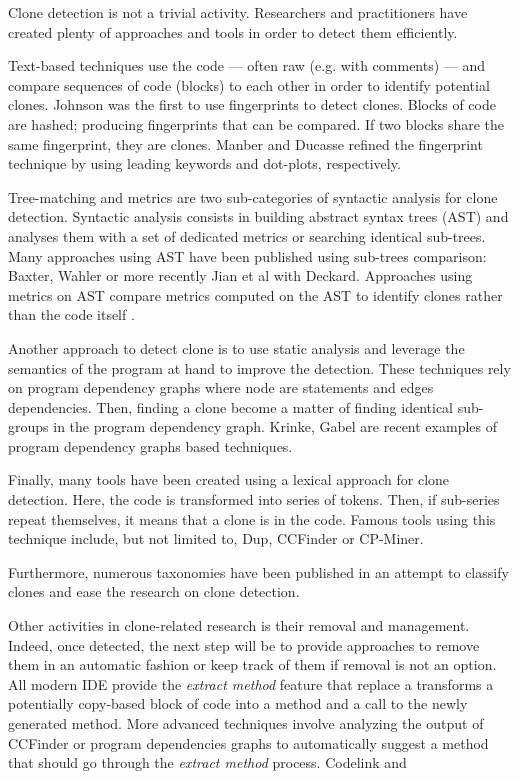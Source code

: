 \documentclass[conference]{IEEEtran}
\begin{document}
Clone detection is not a trivial activity.
Researchers and practitioners have created plenty of approaches and tools in order to detect them efficiently.

Text-based techniques use the code --- often raw (e.g. with comments) --- and compare sequences of code (blocks) to each other in order to identify potential clones.
Johnson was the first to use fingerprints to detect clones\cite{Johnson1993,Johnson1994}.
Blocks of code are hashed; producing fingerprints that can be compared.
If two blocks share the same fingerprint, they are clones.
Manber\cite{Manber1994}  and Ducasse\cite{Ducasse1999} refined the fingerprint technique by using leading keywords and dot-plots, respectively.

Tree-matching and metrics are two sub-categories of syntactic analysis for clone detection. Syntactic analysis consists in building abstract syntax trees (AST) and analyses them with a set of dedicated metrics or searching identical sub-trees. Many approaches using AST have been published using sub-trees comparison: Baxter\cite{Baxter1998}, Wahler\cite{Wahler} or more recently Jian et al with Deckard\cite{Jiang2007}.
Approaches using metrics on AST compare metrics computed on the AST to identify clones rather than the code itself \cite{Patenaude1999, Balazinska}.

Another approach to detect clone is to use static analysis and leverage the semantics of the program at hand to improve the detection.
These techniques rely on program dependency graphs where node are statements and edges dependencies.
Then, finding a clone become a matter of finding identical sub-groups in the program dependency graph.
Krinke\cite{Krinke2001},  Gabel\cite{Gabel2008} are recent examples of program dependency graphs based techniques.

Finally, many tools have been created using a lexical approach for clone detection.
Here, the code is transformed into series of tokens.
Then, if sub-series repeat themselves, it means that a clone is in the code.
Famous tools using this technique include, but not limited to, Dup\cite{Baker}, CCFinder\cite{Kamiya2002} or CP-Miner\cite{Li2006}.

Furthermore, numerous taxonomies have been published in an attempt to classify  clones and ease the research on clone detection\cite{Mayrand1996,Balazinska1999,Koschke2006,Bellon2007,NeilDavey,Kontogiannis,Kapser}.

Other activities in clone-related research is their removal and management.
Indeed, once detected, the next step will be to provide approaches to remove them in an automatic fashion or keep track of them if removal is not an option.
All modern IDE provide the \textit{extract method} feature that replace a transforms a potentially copy-based block of code into a method and a call to the newly generated method\cite{Komondoor,higo2004refactoring}.
More advanced techniques involve analyzing the output of CCFinder\cite{Bomarius2004} or program dependencies graphs\cite{higo2004refactoring} to automatically suggest a method that should go through the \textit{extract method} process.
Codelink\cite{Toomim} and\cite{Duala-Ekoko2007}
\end{document}
